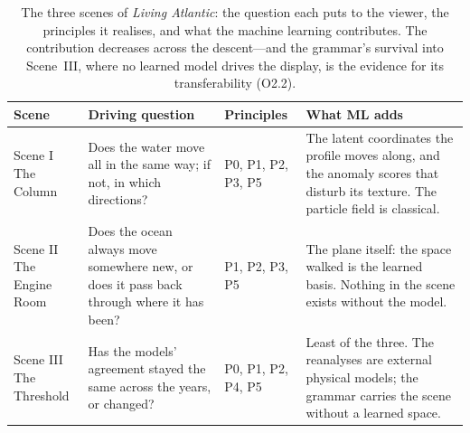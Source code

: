 \begin{table}[htbp]
\centering
\caption[The three scenes at a glance]{The three scenes of \emph{Living Atlantic}: the question each puts to the viewer, the principles it realises, and what the machine learning contributes. The contribution decreases across the descent—and the grammar's survival into Scene~III, where no learned model drives the display, is the evidence for its transferability (O2.2).}
\label{tab:scene-summary}
\small
\renewcommand{\arraystretch}{1.35}

\begin{tabularx}{\textwidth}{@{}p{2.6cm} X p{2.5cm} X@{}}
\toprule
\textbf{Scene} &
\textbf{Driving question} &
\textbf{Principles} &
\textbf{What ML adds} \\
\midrule

\makecell[l]{Scene I\\The Column} &
Does the water move all in the same way; if not, in which directions? &
P0, P1, P2, P3, P5 &
The latent coordinates the profile moves along, and the anomaly scores that disturb its texture. The particle field is classical. \\

\makecell[l]{Scene II\\The Engine Room} &
Does the ocean always move somewhere new, or does it pass back through where it has been? &
P1, P2, P3, P5 &
The plane itself: the space walked is the learned basis. Nothing in the scene exists without the model. \\

\makecell[l]{Scene III\\The Threshold} &
Has the models' agreement stayed the same across the years, or changed? &
P0, P1, P2, P4, P5 &
Least of the three. The reanalyses are external physical models; the grammar carries the scene without a learned space. \\

\bottomrule
\end{tabularx}
\end{table}
